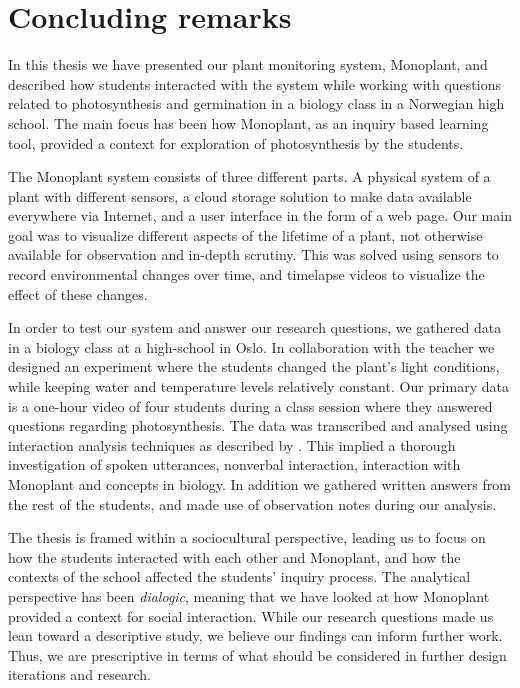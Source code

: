 \chapter{Concluding remarks}
In this thesis we have presented our plant monitoring system, Monoplant, and described how students interacted with the system while working with questions related to photosynthesis and germination in a biology class in a Norwegian high school. The main focus has been how Monoplant, as an inquiry based learning tool, provided a context for exploration of photosynthesis by the students. 

The Monoplant system consists of three different parts. A physical system of a plant with different sensors, a cloud storage solution to make data available everywhere via Internet, and a user interface in the form of a web page. Our main goal was to visualize different aspects of the lifetime of a plant, not otherwise available for observation and in-depth scrutiny. This was solved using sensors to record environmental changes over time, and timelapse videos to visualize the effect of these changes. 

In order to test our system and answer our research questions, we gathered data in a biology class at a high-school in Oslo. In collaboration with the teacher we designed an experiment where the students changed the plant's light conditions, while keeping water and temperature levels relatively constant. Our primary data is a one-hour video of four students during a class session where they answered questions regarding photosynthesis. The data was transcribed and analysed using interaction analysis techniques as described by \citet{jordan1995interaction}. This implied a thorough investigation of spoken utterances, nonverbal interaction, interaction with Monoplant and concepts in biology. In addition we gathered written answers from the rest of the students, and made use of observation notes during our analysis. 

The thesis is framed within a sociocultural perspective, leading us to focus on how the students interacted with each other and Monoplant, and how the contexts of the school affected the students' inquiry process. The analytical perspective has been \emph{dialogic}, meaning that we have looked at how Monoplant provided a context for social interaction. While our research questions made us lean toward a descriptive study, we believe our findings can inform further work. Thus, we are prescriptive in terms of what should be considered in further design iterations and research.


